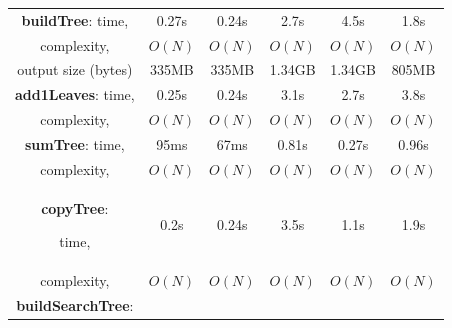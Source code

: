 \documentclass[showabstract,showacknowledgments,showpreface,showdedication]{iuphd}
\theoremstyle{nonumberplain}
\begin{document}
\begin{table}
\begin{center}
\begin{tabular}{ |c|c|c|c|c|c| }
        {\bf buildTree}:
        time,               & 0.27s     &  0.24s    & 2.7s &  4.5s  & 1.8s   \\
        complexity,         & $O(N)$    &  $O(N)$   &  $O(N)$ & $O(N)$  &  $O(N)$ \\
        output size (bytes) & 335MB     &  335MB    &  1.34GB &  1.34GB &  805MB       \\
        \hline

        {\bf add1Leaves}:
        time,               & 0.25s     &  0.24s  & 3.1s     & 2.7s    &  3.8s  \\
        complexity,         & $O(N)$    &  $O(N)$ & $O(N)$   & $O(N)$  &  $O(N)$ \\
        \hline
            {\bf sumTree}:
            time,               & 95ms     & 67ms     & 0.81s   &  0.27s  &  0.96s  \\
            complexity,         & $O(N)$   & $O(N)$   & $O(N)$  & $O(N)$  &  $O(N)$ \\
            \hline
                {\bf copyTree}:

                time,               & 0.2s      & 0.24s   & 3.5s   &  1.1s   &  1.9s       \\
                complexity,         & $O(N)$    & $O(N)$  & $O(N)$ & $O(N)$  &  $O(N)$ \\

                \hline
                \hline
                    {\bf buildSearchTree}:


\end{tabular}
\end{center}
\end{table}
\end{document}
